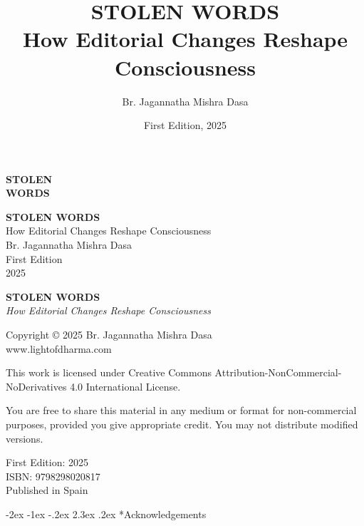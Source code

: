 \documentclass[12pt,twoside]{book}
\author{Br. Jagannatha Mishra Dasa}
\date{First Edition, 2025}
\title{STOLEN WORDS\\\medskip
\large How Editorial Changes Reshape Consciousness}
\makeatletter
\renewcommand\section{\@startsection{section}{1}{\z@}%
{-2ex \@plus -1ex \@minus -.2ex}%
{2.3ex \@plus.2ex}%
{\normalfont\Large\bfseries}}
\makeatother
\begin{document}
\thispagestyle{frontmatter}
\vspace*{0.38\textheight}
\begin{center}
{\fontsize{40}{48}\selectfont\textbf{STOLEN}}\\[0.6cm]
{\fontsize{40}{48}\selectfont\textbf{WORDS}}
\end{center}
\vspace*{\fill}
\clearpage

\thispagestyle{frontmatter}
\mbox{}
\newpage

\thispagestyle{frontmatter}
\vspace*{0.35\textheight}
\begin{center}
{\fontsize{36}{42}\selectfont\textbf{STOLEN WORDS}}\\[0.5cm]
{\large How Editorial Changes Reshape Consciousness}\\
\vspace{0.25\textheight}
{\Large Br. Jagannatha Mishra Dasa}\\
\vspace*{\fill}
{\normalsize First Edition}\\[0.3cm]
{\normalsize 2025}\\[1cm]
\end{center}
\clearpage

\thispagestyle{frontmatter}
\textbf{STOLEN WORDS}\\
\emph{How Editorial Changes Reshape Consciousness}

Copyright © 2025 Br. Jagannatha Mishra Dasa\\
www.lightofdharma.com

This work is licensed under Creative Commons Attribution-NonCommercial-NoDerivatives 4.0 International License.

You are free to share this material in any medium or format for non-commercial purposes, provided you give appropriate credit. You may not distribute modified versions.

\vspace*{\fill}

First Edition: 2025\\
ISBN: 9798298020817\\
Published in Spain

\clearpage

\thispagestyle{empty}
{\let\clearpage\relax\tableofcontents}

\clearpage

\section*{Acknowledgements}
\thispagestyle{frontmatter}
\end{document}
